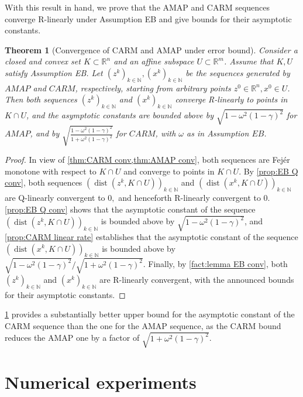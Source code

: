 \documentclass[smallextended,numbook,nospthms]{svjour3}
\theoremstyle{plain}
\newtheorem{theorem}{Theorem}[section]
\theoremstyle{definition}
\def\RR{\mathds R}
\def\NN{\mathds N}
\DeclareMathOperator{\dist}{dist}
\begin{document}
With this result in hand, we prove that the AMAP and CARM sequences converge R-linearly under Assumption EB and give bounds for their asymptotic constants.

\begin{theorem}[Convergence of CARM and AMAP under error bound]\label{thm:CARM EB conv}
	Consider a closed and convex set $K \subset \RR^{n}$ and an affine subspace $U \subset \RR^{m}$. Assume that $K, U$ satisfy Assumption EB. Let $\left(z^{k}\right)_{k \in \NN},\left(x^{k}\right)_{k \in \NN}$ be the sequences generated by $AMAP$ and $CARM$, respectively, starting from arbitrary points $z^{0} \in \RR^{n}, x^{0} \in U$. Then both sequences $\left(z^{k}\right)_{k \in \NN}$ and $\left(x^{k}\right)_{k \in \NN}$
	converge R-linearly to points in $K \cap U$, and the asymptotic constants are bounded above by $\sqrt{1-\omega^{2}(1-\gamma)^{2}}$ for $AMAP$, and by $\sqrt{\frac{1-\omega^{2}(1-\gamma)^{2}}{1+\omega^{2}(1-\gamma)^{2}}}$ for $CARM$, with $\omega$ as in Assumption $EB$.
\end{theorem}
\begin{proof}
	In view of \cref{thm:CARM conv,thm:AMAP conv}, both sequences are Fejér monotone with respect to $K \cap U$ and converge to points in $K \cap U$. By \cref{prop:EB Q conv}, both sequences $\left(\dist\left(z^{k}, K \cap U\right)\right)_{k \in \NN}$ and $\left(\dist\left(x^{k}, K \cap U\right)\right)_{k \in \NN}$ are Q-linearly convergent to $0,$ and henceforth R-linearly convergent to 0. 
	\cref{prop:EB Q conv} shows that the asymptotic constant of the sequence $\left(\dist\left(z^{k}, K \cap U\right)\right)_{k \in \NN}$ is bounded above by $\sqrt{1-\omega^{2}(1-\gamma)^{2}}$, and \cref{prop:CARM linear rate} establishes that the asymptotic constant of the sequence $\left(\dist\left(x^{k}, K \cap U\right)\right)_{k \in \NN}$ is bounded above by $\sqrt{1-\omega^{2}(1-\gamma)^{2}} / \sqrt{1+\omega^{2}(1-\gamma)^{2}}$. Finally, by \cref{fact:lemma EB conv}, both $\left(z^{k}\right)_{k \in \NN}$ and $\left(x^{k}\right)_{k \in \NN}$ are R-linearly convergent, with the announced bounds for their asymptotic constants.
\end{proof}

\cref{thm:CARM EB conv} provides a substantially better upper bound for the asymptotic constant of the CARM sequence than the one for the AMAP sequence, as the CARM bound reduces the AMAP one by a factor of $\sqrt{1+\omega^{2}(1-\gamma)^2}$.

\newpage
\section{Numerical experiments}\label{sec:numerical}
\end{document}
